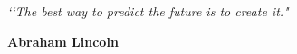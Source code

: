 
\begin{epigrafe}
\vspace*{\fill}
\begin{flushright}
\textit{‘‘The best way to predict the future is to create it."\\}
\vspace{\onelineskip}
{\bfseries
Abraham Lincoln
\par}
\end{flushright}
\end{epigrafe}
